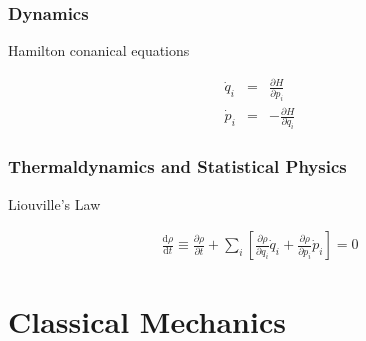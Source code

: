 \subsection{Dynamics}

Hamilton conanical equations

\begin{eqnarray}
\dot q_i &=& \frac{\partial H}{\partial p_i}  \\
\dot p_i &=& - \frac{\partial H}{\partial q_i}
\end{eqnarray}


\subsection{Thermaldynamics and Statistical Physics}

Liouville's Law

\begin{eqnarray}
\frac{\mathrm d \rho}{\mathrm d t}\equiv \frac{\partial \rho}{\partial t} + \sum_i \left[ \frac{\partial \rho}{\partial q_i}\dot q_i + \frac{\partial \rho}{\partial p_i}\dot p_i \right] = 0
\end{eqnarray}































\chapter{Classical Mechanics}




